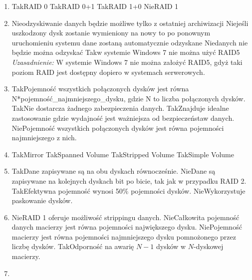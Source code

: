\begin{enumerate}
		{Nie}{wszystkie 3 dyski spięte w RAID5}%
		{Nie}{wszystkie dyski spięte w mirror}
		\item {}%
		{Tak}{RAID 0}%
		{Tak}{RAID 0+1}%
		{Tak}{RAID 1+0}%
		{Nie}{RAID 1}
		\item {}%
		{Nie}{odzyskiwanie danych będzie możliwe tylko z ostatniej archiwizacji}%
		{Nie}{jeśli uszkodzony dysk zostanie wymieniony na nowy to po ponownym uruchomieniu systemu dane zostaną automatycznie odzyskane}%
		{Nie}{danych nie będzie można odzyskać}%
		{Tak}{w systemie Windows 7 nie można użyć RAID5}
		{\small \emph{Uzasadnienie:} W systemie Windows 7 nie można założyć RAID5, gdyż taki poziom RAID jest dostępny dopiero w systemach serwerowych.}
		\item {}%
		{Tak}{Pojemność wszystkich połączonych dysków jest równa N*pojemność\_najmniejszego\_dysku, gdzie N to liczba połączonych dysków.}%
		{Tak}{Nie dostarcza żadnego zabezpieczenia danych.}%
		{Tak}{Znajduje idealne zastosowanie gdzie wydajność jest ważniejsza od bezpieczeństaw danych.}%
		{Nie}{Pojemność wszystkich połączonych dysków jest równa pojemności najmniejszego z nich.}
		\item {}%
		{Tak}{Mirror}%
		{Tak}{Spanned Volume}%
		{Tak}{Stripped Volume}%
		{Tak}{Simple Volume}
		\item {}%
		{Tak}{Dane zapisywane są na obu dyskach równocześnie.}%
		{Nie}{Dane są zapisywane na kolejnych dyskach bit po bicie, tak jak w przypadku RAID 2.}%
		{Tak}{Efektywna pojemność wynosi 50\% pojemności dysków.}%
		{Nie}{Wykorzystuje paskowanie dysków.}
		\item {}%
		{Nie}{RAID 1 oferuje możliwość strippingu danych.}%
		{Nie}{Całkowita pojemność danych macierzy jest równa pojemności największego dysku.}%
		{Nie}{Pojemność macierzy jest równa pojemności najmniejszego dysku pomnożonego przez liczbę dysków.}%
		{Tak}{Odporność na awarię $ N-1 $ dysków w $ N $-dyskowej macierzy.}
		\newpage
		\item {}%

\end{enumerate}

